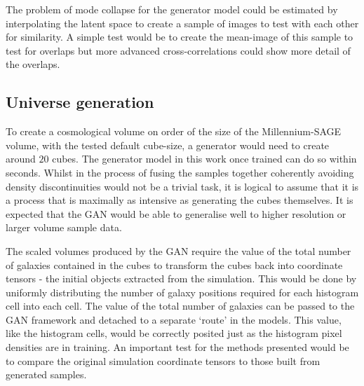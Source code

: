 \documentclass[twocolumn]{article}
\numberwithin{equation}{section}
\begin{document}

The problem of mode collapse for the generator model could be estimated by interpolating the 
latent space to create a sample of images to test with each other for similarity. A simple test would be to create the 
mean-image of this sample to test for overlaps but more advanced cross-correlations could show more detail of the overlaps.  


\subsection{Universe generation} 
To create a cosmological volume on order of the size of the Millennium-SAGE volume, with the tested default cube-size, a 
generator would need to create around $20$ cubes. The generator model in this work once trained can do so within 
seconds. Whilst in the process of fusing the samples together coherently avoiding density discontinuities would not be a 
trivial task, it is logical to assume that it is a process that is maximally as intensive as generating the cubes 
themselves. It is expected that the GAN would be able to generalise well to higher resolution or larger volume sample data.  

The scaled volumes produced by the GAN require the value of the total number of galaxies contained in the cubes to 
transform the cubes back into coordinate tensors - the initial objects extracted from the simulation. This would be done 
by uniformly distributing the number of galaxy positions required for each histogram cell into each cell. The value of the
total number of galaxies can be passed to the GAN framework and detached to a separate `route' in the models. This value, 
like the histogram cells, would be correctly posited just as the histogram pixel densities are in training. An important 
test for the methods presented would be to compare the original simulation coordinate tensors to those built from generated
samples. 

\end{document}
